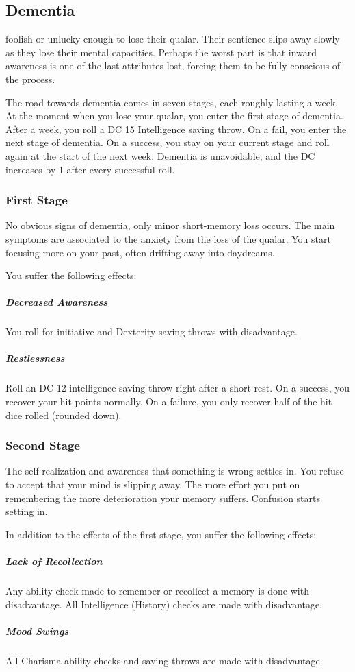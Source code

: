 \subsection*{Dementia} \label{ssec::dementia}
foolish or unlucky enough to lose their qualar.
Their sentience slips away slowly as they lose their mental capacities.
Perhaps the worst part is that inward awareness is one of the last attributes lost, forcing them to be fully conscious of the process.

The road towards dementia comes in seven stages, each roughly lasting a week.
At the moment when you lose your qualar, you enter the first stage of dementia.
After a week, you roll a DC 15 Intelligence saving throw.
On a fail, you enter the next stage of dementia.
On a success, you stay on your current stage and roll again at the start of the next week.
Dementia is unavoidable, and the DC increases by 1 after every successful roll.

\subsubsection{First Stage}
No obvious signs of dementia, only minor short-memory loss occurs.
The main symptoms are associated to the anxiety from the loss of the qualar.
You start focusing more on your past, often drifting away into daydreams.

You suffer the following effects:
\subparagraph{Decreased Awareness} You roll for initiative and Dexterity saving throws with disadvantage.
\subparagraph{Restlessness} Roll an DC 12 intelligence saving throw right after a short rest.
On a success, you recover your hit points normally.
On a failure, you only recover half of the hit dice rolled (rounded down).

\subsubsection{Second Stage}
The self realization and awareness that something is wrong settles in.
You refuse to accept that your mind is slipping away.
The more effort you put on remembering the more deterioration your memory suffers.
Confusion starts setting in.

In addition to the effects of the first stage, you suffer the following effects:
\subparagraph{Lack of Recollection} Any ability check made to remember or recollect a memory is done with disadvantage.
All Intelligence (History) checks are made with disadvantage.
\subparagraph{Mood Swings} All Charisma ability checks and saving throws are made with disadvantage.

